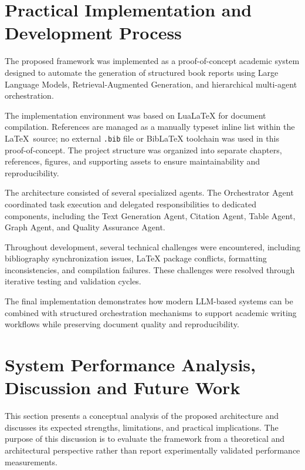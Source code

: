
\section{Practical Implementation and Development Process}

The proposed framework was implemented as a proof-of-concept academic system designed to automate the generation of structured book reports using Large Language Models, Retrieval-Augmented Generation, and hierarchical multi-agent orchestration.

The implementation environment was based on LuaLaTeX for document compilation. References are managed as a manually typeset inline list within the \LaTeX\ source; no external \texttt{.bib} file or BibLaTeX toolchain was used in this proof-of-concept. The project structure was organized into separate chapters, references, figures, and supporting assets to ensure maintainability and reproducibility.

The architecture consisted of several specialized agents. The Orchestrator Agent coordinated task execution and delegated responsibilities to dedicated components, including the Text Generation Agent, Citation Agent, Table Agent, Graph Agent, and Quality Assurance Agent.

Throughout development, several technical challenges were encountered, including bibliography synchronization issues, LaTeX package conflicts, formatting inconsistencies, and compilation failures. These challenges were resolved through iterative testing and validation cycles.

The final implementation demonstrates how modern LLM-based systems can be combined with structured orchestration mechanisms to support academic writing workflows while preserving document quality and reproducibility.

\section{System Performance Analysis, Discussion and Future Work}
This section presents a conceptual analysis of the proposed architecture and discusses its expected strengths, limitations, and practical implications. The purpose of this discussion is to evaluate the framework from a theoretical and architectural perspective rather than report experimentally validated performance measurements.

